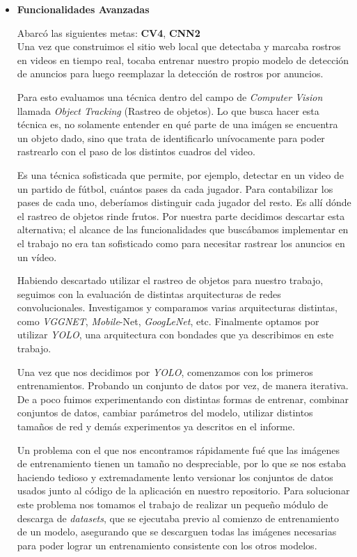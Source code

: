 \documentclass[a4paper]{article}
\begin{document}
\begin{itemize}
\item \textbf{Funcionalidades Avanzadas}

Abarcó las siguientes metas: \textbf{CV4}, \textbf{CNN2} \\

Una vez que construimos el sitio web local que detectaba y marcaba rostros en videos en tiempo real, tocaba entrenar nuestro propio modelo de detección de anuncios para luego reemplazar la detección de rostros por anuncios.

Para esto evaluamos una técnica dentro del campo de \textit{Computer Vision} llamada \textit{Object Tracking} (Rastreo de objetos). Lo que busca hacer esta técnica es, no solamente entender en qué parte de una imágen se encuentra un objeto dado, sino que trata de identificarlo unívocamente para poder rastrearlo con el paso de los distintos cuadros del video.

Es una técnica sofisticada que permite, por ejemplo, detectar en un video de un partido de fútbol, cuántos pases da cada jugador. Para contabilizar los pases de cada uno, deberíamos distinguir cada jugador del resto. Es allí dónde el rastreo de objetos rinde frutos.
Por nuestra parte decidimos descartar esta alternativa; el alcance de las funcionalidades que buscábamos implementar en el trabajo no era tan sofisticado como para necesitar rastrear los anuncios en un vídeo.

Habiendo descartado utilizar el rastreo de objetos para nuestro trabajo, seguimos con la evaluación de distintas arquitecturas de redes convolucionales. Investigamos y comparamos varias arquitecturas distintas, como \textit{VGGNET}, \textit{Mobile}-Net, \textit{GoogLeNet}, etc. Finalmente optamos por utilizar \textit{YOLO}, una arquitectura con bondades que ya describimos en este trabajo.

Una vez que nos decidimos por \textit{YOLO}, comenzamos con los primeros entrenamientos. Probando un conjunto de datos por vez, de manera iterativa. De a poco fuimos experimentando con distintas formas de entrenar, combinar conjuntos de datos, cambiar parámetros del modelo, utilizar distintos tamaños de red y demás experimentos ya descritos en el informe.

Un problema con el que nos encontramos rápidamente fué que las imágenes de entrenamiento tienen un tamaño no despreciable, por lo que se nos estaba haciendo tedioso y extremadamente lento versionar los conjuntos de datos usados junto al código de la aplicación en nuestro repositorio. Para solucionar este problema nos tomamos el trabajo de realizar un pequeño módulo de descarga de \textit{datasets}, que se ejecutaba previo al comienzo de entrenamiento de un modelo, asegurando que se descarguen todas las imágenes necesarias para poder lograr un entrenamiento consistente con los otros modelos.


\end{itemize}
\end{document}

